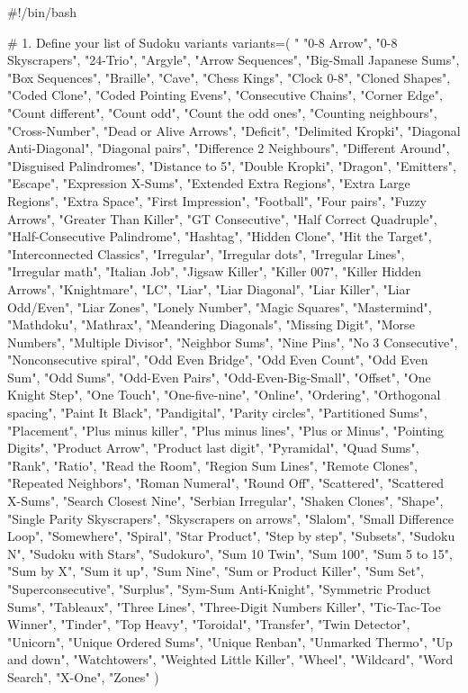 #!/bin/bash

# 1. Define your list of Sudoku variants
variants=(
  "%
  "0-8 Arrow",
  "0-8 Skyscrapers",
  "24-Trio",
  "Argyle",
  "Arrow Sequences",
  "Big-Small Japanese Sums",
  "Box Sequences",
  "Braille",
  "Cave",
  "Chess Kings",
  "Clock 0-8",
  "Cloned Shapes",
  "Coded Clone",
  "Coded Pointing Evens",
  "Consecutive Chains",
  "Corner Edge",
  "Count different",
  "Count odd",
  "Count the odd ones",
  "Counting neighbours",
  "Cross-Number",
  "Dead or Alive Arrows",
  "Deficit",
  "Delimited Kropki",
  "Diagonal Anti-Diagonal",
  "Diagonal pairs",
  "Difference 2 Neighbours",
  "Different Around",
  "Disguised Palindromes",
  "Distance to 5",
  "Double Kropki",
  "Dragon",
  "Emitters",
  "Escape",
  "Expression X-Sums",
  "Extended Extra Regions",
  "Extra Large Regions",
  "Extra Space",
  "First Impression",
  "Football",
  "Four pairs",
  "Fuzzy Arrows",
  "Greater Than Killer",
  "GT Consecutive",
  "Half Correct Quadruple",
  "Half-Consecutive Palindrome",
  "Hashtag",
  "Hidden Clone",
  "Hit the Target",
  "Interconnected Classics",
  "Irregular",
  "Irregular dots",
  "Irregular Lines",
  "Irregular math",
  "Italian Job",
  "Jigsaw Killer",
  "Killer 007",
  "Killer Hidden Arrows",
  "Knightmare",
  "LC",
  "Liar",
  "Liar Diagonal",
  "Liar Killer",
  "Liar Odd/Even",
  "Liar Zones",
  "Lonely Number",
  "Magic Squares",
  "Mastermind",
  "Mathdoku",
  "Mathrax",
  "Meandering Diagonals",
  "Missing Digit",
  "Morse Numbers",
  "Multiple Divisor",
  "Neighbor Sums",
  "Nine Pins",
  "No 3 Consecutive",
  "Nonconsecutive spiral",
  "Odd Even Bridge",
  "Odd Even Count",
  "Odd Even Sum",
  "Odd Sums",
  "Odd-Even Pairs",
  "Odd-Even-Big-Small",
  "Offset",
  "One Knight Step",
  "One Touch",
  "One-five-nine",
  "Online",
  "Ordering",
  "Orthogonal spacing",
  "Paint It Black",
  "Pandigital",
  "Parity circles",
  "Partitioned Sums",
  "Placement",
  "Plus minus killer",
  "Plus minus lines",
  "Plus or Minus",
  "Pointing Digits",
  "Product Arrow",
  "Product last digit",
  "Pyramidal",
  "Quad Sums",
  "Rank",
  "Ratio",
  "Read the Room",
  "Region Sum Lines",
  "Remote Clones",
  "Repeated Neighbors",
  "Roman Numeral",
  "Round Off",
  "Scattered",
  "Scattered X-Sums",
  "Search Closest Nine",
  "Serbian Irregular",
  "Shaken Clones",
  "Shape",
  "Single Parity Skyscrapers",
  "Skyscrapers on arrows",
  "Slalom",
  "Small Difference Loop",
  "Somewhere",
  "Spiral",
  "Star Product",
  "Step by step",
  "Subsets",
  "Sudoku N",
  "Sudoku with Stars",
  "Sudokuro",
  "Sum 10 Twin",
  "Sum 100",
  "Sum 5 to 15",
  "Sum by X",
  "Sum it up",
  "Sum Nine",
  "Sum or Product Killer",
  "Sum Set",
  "Superconsecutive",
  "Surplus",
  "Sym-Sum Anti-Knight",
  "Symmetric Product Sums",
  "Tableaux",
  "Three Lines",
  "Three-Digit Numbers Killer",
  "Tic-Tac-Toe Winner",
  "Tinder",
  "Top Heavy",
  "Toroidal",
  "Transfer",
  "Twin Detector",
  "Unicorn",
  "Unique Ordered Sums",
  "Unique Renban",
  "Unmarked Thermo",
  "Up and down",
  "Watchtowers",
  "Weighted Little Killer",
  "Wheel",
  "Wildcard",
  "Word Search",
  "X-One",
  "Zones"
)

